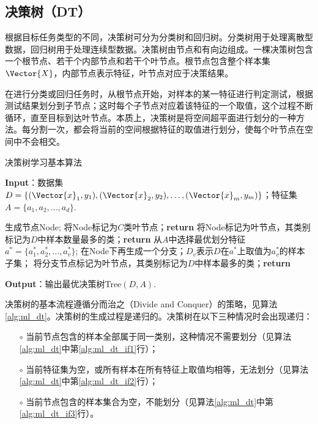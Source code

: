 \subsection{决策树（DT）}\label{sec:ml_dt}

根据目标任务类型的不同，决策树可分为分类树和回归树。分类树用于处理离散型数据，回归树用于处理连续型数据。决策树由节点和有向边组成。一棵决策树包含一个根节点、若干个内部节点和若干个叶节点。根节点包含整个样本集$\Vector{X}$，内部节点表示特征，叶节点对应于决策结果。

在进行分类或回归任务时，从根节点开始，对样本的某一特征进行判定测试，根据测试结果划分到子节点；这时每个子节点对应着该特征的一个取值，这个过程不断循环，直至目标到达叶节点。本质上，决策树是将空间超平面进行划分的一种方法。每分割一次，都会将当前的空间根据特征的取值进行划分，使每个叶节点在空间中不会相交。

\begin{algorithm}[!htbp]
  \small
  \caption{决策树学习基本算法}
  \label{alg:ml_dt}
  \textbf{Input}：{数据集$D=\{(\Vector{x}_1,y_1),(\Vector{x}_2,y_2),\ldots,(\Vector{x}_m,y_m)\}$；特征集$A=\{a_1,a_2,\ldots,a_d\}$.}
  \begin{algorithmic}[1]
    \State 生成节点Node;
    \State 将Node标记为$C$类叶节点；\textbf{return}\label{alg:ml_dt_if1}
    \EndIf
    \State 将Node标记为叶节点，其类别标记为$D$中样本数量最多的类；\textbf{return}\label{alg:ml_dt_if2}
    \EndIf
    \State 从$A$中选择最优划分特征$a^*=\{a_1^*,a_2^*,\ldots,a_v^*\}$;
      \State 在Node下再生成一个分支；$D_v$表示$D$在$a^*$上取值为$a_v^*$的样本子集；
      \State 将分支节点标记为叶节点，其类别标记为$D$中样本最多的类；\textbf{return} \label{alg:ml_dt_if3}
      \EndIf 
    \EndFor
    \EndProcedure
  \end{algorithmic}
  \textbf{Output}：{输出最优决策树Tree$(D,A)$.}
\end{algorithm}

决策树的基本流程遵循分而治之（Divide and Conquer）的策略，见算法\ref{alg:ml_dt}。决策树的生成过程是递归的。决策树在以下三种情况时会出现递归：
\begin{enumerate}
  \item[$\circ$] 当前节点包含的样本全部属于同一类别，这种情况不需要划分（见算法\ref{alg:ml_dt}中第\ref{alg:ml_dt_if1}行）；
  \item[$\circ$] 当前特征集为空，或所有样本在所有特征上取值均相等，无法划分（见算法\ref{alg:ml_dt}中第\ref{alg:ml_dt_if2}行）；
  \item[$\circ$] 当前节点包含的样本集合为空，不能划分（见算法\ref{alg:ml_dt}中第\ref{alg:ml_dt_if3}行）。
\end{enumerate}

